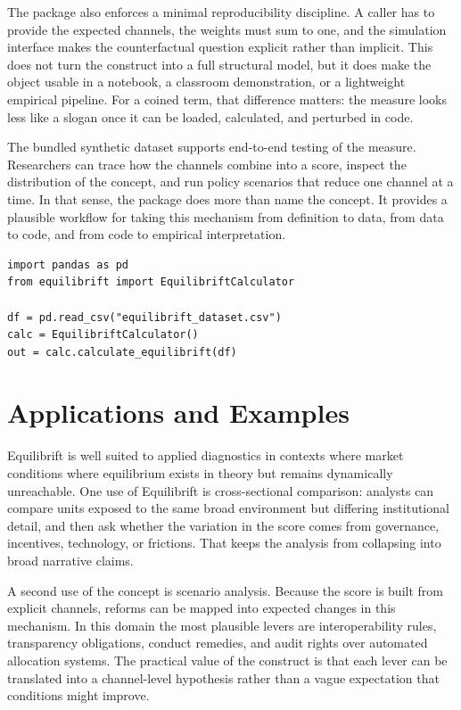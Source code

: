 \documentclass[12pt]{article}
\begin{document}
The package also enforces a minimal reproducibility discipline. A caller has to provide the expected channels, the weights must sum to one, and the simulation interface makes the counterfactual question explicit rather than implicit. This does not turn the construct into a full structural model, but it does make the object usable in a notebook, a classroom demonstration, or a lightweight empirical pipeline. For a coined term, that difference matters: the measure looks less like a slogan once it can be loaded, calculated, and perturbed in code.

The bundled synthetic dataset supports end-to-end testing of the measure. Researchers can trace how the channels combine into a score, inspect the distribution of the concept, and run policy scenarios that reduce one channel at a time. In that sense, the package does more than name the concept. It provides a plausible workflow for taking this mechanism from definition to data, from data to code, and from code to empirical interpretation.

\begin{verbatim}
import pandas as pd
from equilibrift import EquilibriftCalculator

df = pd.read_csv("equilibrift_dataset.csv")
calc = EquilibriftCalculator()
out = calc.calculate_equilibrift(df)
\end{verbatim}

\section{Applications and Examples}
Equilibrift is well suited to applied diagnostics in contexts where market conditions where equilibrium exists in theory but remains dynamically unreachable. One use of Equilibrift is cross-sectional comparison: analysts can compare units exposed to the same broad environment but differing institutional detail, and then ask whether the variation in the score comes from governance, incentives, technology, or frictions. That keeps the analysis from collapsing into broad narrative claims.

A second use of the concept is scenario analysis. Because the score is built from explicit channels, reforms can be mapped into expected changes in this mechanism. In this domain the most plausible levers are interoperability rules, transparency obligations, conduct remedies, and audit rights over automated allocation systems. The practical value of the construct is that each lever can be translated into a channel-level hypothesis rather than a vague expectation that conditions might improve.
\end{document}
